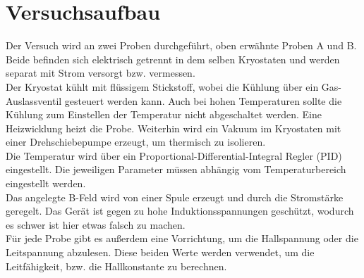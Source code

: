 \newpage

\section{Versuchsaufbau}
Der Versuch wird an zwei Proben durchgeführt, oben erwähnte Proben A und B. Beide befinden sich elektrisch getrennt in dem selben Kryostaten und werden separat mit Strom versorgt bzw. vermessen. \\
Der Kryostat kühlt mit flüssigem Stickstoff, wobei die Kühlung über ein Gas-Auslassventil gesteuert werden kann. Auch bei hohen Temperaturen sollte die Kühlung zum Einstellen der Temperatur nicht abgeschaltet werden. Eine Heizwicklung heizt die Probe. Weiterhin wird ein Vakuum im Kryostaten mit einer Drehschiebepumpe erzeugt, um thermisch zu isolieren. \\
Die Temperatur wird über ein Proportional-Differential-Integral Regler (PID) eingestellt. Die jeweiligen Parameter müssen abhängig vom Temperaturbereich eingestellt werden. \\
Das angelegte B-Feld wird von einer Spule erzeugt und durch die Stromstärke geregelt. Das Gerät ist gegen zu hohe Induktionsspannungen geschützt, wodurch es schwer ist hier etwas falsch zu machen. \\
Für jede Probe gibt es außerdem eine Vorrichtung, um die Hallspannung oder die Leitspannung abzulesen. Diese beiden Werte werden verwendet, um die Leitfähigkeit, bzw. die Hallkonstante zu berechnen.

